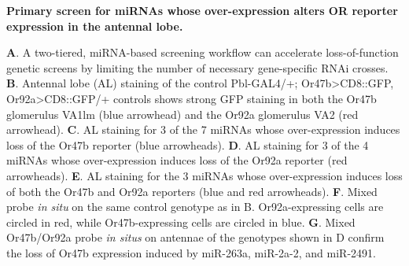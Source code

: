 {\bf Primary screen for miRNAs whose over-expression alters OR reporter expression in the antennal lobe.}

\textbf{A}.
A two-tiered, miRNA-based screening workflow can accelerate loss-of-function genetic screens by limiting the number of necessary gene-specific RNAi crosses.
\textbf{B}.
Antennal lobe (AL) staining of the control Pbl-GAL4/+; Or47b\textgreater{}CD8::GFP, Or92a\textgreater{}CD8::GFP/+ controls shows strong GFP staining in both the Or47b glomerulus VA1lm (blue arrowhead) and the Or92a glomerulus VA2 (red arrowhead).
\textbf{C}.
AL staining for 3 of the 7 miRNAs whose over-expression induces loss of the Or47b reporter (blue arrowheads).
\textbf{D}.
AL staining for 3 of the 4 miRNAs whose over-expression induces loss of the Or92a reporter (red arrowheads).
\textbf{E}.
AL staining for the 3 miRNAs whose over-expression induces loss of both the Or47b and Or92a reporters (blue and red arrowheads).
\textbf{F}.
Mixed probe \emph{in situ} on the same control genotype as in B.
Or92a-expressing cells are circled in red, while Or47b-expressing cells are circled in blue.
\textbf{G}.
Mixed Or47b/Or92a probe \emph{in situs} on antennae of the genotypes shown in D confirm the loss of Or47b expression induced by miR-263a, miR-2a-2, and miR-2491.